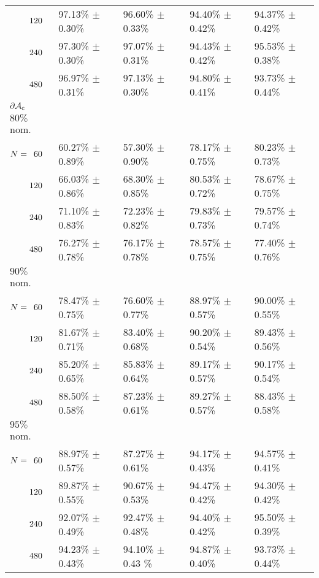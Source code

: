 \begin{table}[htbp]
\begin{tabular}{@{}p{}*{4}{L{\tabcolsep\relax}}@{}}
$\hphantom{N{}={}}120$ & 97.13\% $\pm$ 0.30\% & 96.60\% $\pm$ 0.33\% & 94.40\% $\pm$ 0.42\% & 94.37\% $\pm$ 0.42\% \\[-0.4em]
$\hphantom{N{}={}}240$ & 97.30\% $\pm$ 0.30\% & 97.07\% $\pm$ 0.31\% & 94.43\% $\pm$ 0.42\% & 95.53\% $\pm$ 0.38\% \\[-0.4em]
$\hphantom{N{}={}}480$ & 96.97\% $\pm$ 0.31\% & 97.13\% $\pm$ 0.30\% & 94.80\% $\pm$ 0.41\% & 93.73\% $\pm$ 0.44\%\\
\midrule
$\mathbf{\operatorname{\partial\mathcal{A}_{c}}}$\\[-0.4em]
$80\%$ nom.\\[-0.4em]
$N = \hphantom{1}60$ & 60.27\% $\pm$ 0.89\% & 57.30\% $\pm$ 0.90\% & 78.17\% $\pm$ 0.75\% & 80.23\% $\pm$ 0.73\% \\[-0.4em]
$\hphantom{N{}={}}120$ & 66.03\% $\pm$ 0.86\% & 68.30\% $\pm$ 0.85\% & 80.53\% $\pm$ 0.72\% & 78.67\% $\pm$ 0.75\%\\[-0.4em]
$\hphantom{N{}={}}240$ & 71.10\% $\pm$ 0.83\% & 72.23\% $\pm$ 0.82\% & 79.83\% $\pm$ 0.73\% & 79.57\% $\pm$ 0.74\% \\[-0.4em]
$\hphantom{N{}={}}480$ & 76.27\% $\pm$ 0.78\% & 76.17\% $\pm$ 0.78\% & 78.57\% $\pm$ 0.75\% & 77.40\% $\pm$ 0.76\%\\ 
$90\%$ nom.  \\[-0.4em]
$N = \hphantom{1}60$ & 78.47\% $\pm$ 0.75\% & 76.60\% $\pm$ 0.77\% & 88.97\% $\pm$ 0.57\% & 90.00\% $\pm$ 0.55\% \\[-0.4em]
$\hphantom{N{}={}}120$ & 81.67\% $\pm$ 0.71\% & 83.40\% $\pm$ 0.68\% & 90.20\% $\pm$ 0.54\% & 89.43\% $\pm$ 0.56\% \\[-0.4em]
$\hphantom{N{}={}}240$ & 85.20\% $\pm$ 0.65\% & 85.83\% $\pm$ 0.64\% & 89.17\% $\pm$ 0.57\% & 90.17\% $\pm$ 0.54\% \\[-0.4em]
$\hphantom{N{}={}}480$ & 88.50\% $\pm$ 0.58\% & 87.23\% $\pm$ 0.61\% & 89.27\% $\pm$ 0.57\% & 88.43\% $\pm$ 0.58\%\\ 
$95\%$ nom.  \\[-0.4em]
$N = \hphantom{1}60$ & 88.97\% $\pm$ 0.57\% & 87.27\% $\pm$ 0.61\% & 94.17\% $\pm$ 0.43\% & 94.57\% $\pm$ 0.41\% \\[-0.4em]
$\hphantom{N{}={}}120$ & 89.87\% $\pm$ 0.55\% & 90.67\% $\pm$ 0.53\% & 94.47\% $\pm$ 0.42\% & 94.30\% $\pm$ 0.42\% \\[-0.4em]
$\hphantom{N{}={}}240$ & 92.07\% $\pm$ 0.49\% & 92.47\% $\pm$ 0.48\% & 94.40\% $\pm$ 0.42\% & 95.50\% $\pm$ 0.39\% \\[-0.4em]
$\hphantom{N{}={}}480$ & 94.23\% $\pm$ 0.43\% & 94.10\% $\pm$ 0.43 \% & 94.87\% $\pm$ 0.40\% & 93.73\% $\pm$ 0.44\%\\
\bottomrule
\end{tabular}
\label{table:mr}
\end{table}

